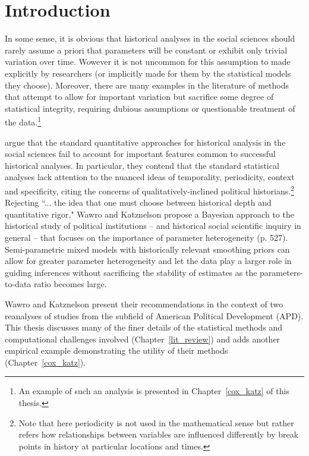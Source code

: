 \chapter{Introduction}
\label{introduction}

In some sense, it is obvious that historical analyses in the social sciences should rarely assume a priori that parameters will be constant or exhibit only trivial variation over time. Wowever it is not uncommon for this assumption to made explicitly by researchers (or implicitly made for them by the statistical models they choose). Moreover, there are many examples in the literature of methods that attempt to allow for important variation but sacrifice some degree of statistical integrity, requiring dubious assumptions or questionable treatment of the data.\footnote{An example of such an analysis is presented in Chapter~\ref{cox_katz} of this thesis.}  

 argue that the standard quantitative approaches for historical analysis in the social sciences fail to account for important features common to successful historical analyses. In particular, they contend that the standard statistical analyses lack attention to the nuanced ideas of temporality, periodicity, context and specificity, citing the concerns of qualitatively-inclined political historians.\footnote{Note that here periodicity is not used in the mathematical sense but rather refers how relationships between variables are influenced differently by break points in history at particular locations and times.}  Rejecting ``... the idea that one must choose between historical depth and quantitative rigor," Wawro and Katznelson propose a Bayesian approach to the historical study of political institutions -- and historical social scientific inquiry in general --  that focuses on the importance of parameter heterogeneity (p. 527). Semi-parametric mixed models with historically relevant smoothing priors can allow for greater parameter heterogeneity and let the data play a larger role in guiding inferences without sacrificing the stability of estimates as the parameters-to-data ratio becomes large.  

Wawro and Katznelson present their recommendations in the context of two reanalyses of studies from the subfield of American Political Development (APD). This thesis discusses many of the finer details of the statistical methods and computational challenges involved (Chapter~\ref{lit_review}) and adds another empirical example demonstrating the utility of their methods (Chapter~\ref{cox_katz}). 